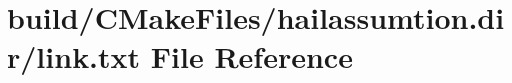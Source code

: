 \hypertarget{hailassumtion_8dir_2link_8txt}{}\section{build/\+C\+Make\+Files/hailassumtion.dir/link.txt File Reference}
\label{hailassumtion_8dir_2link_8txt}
